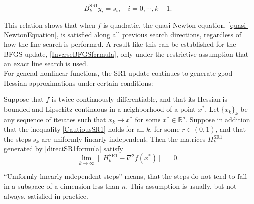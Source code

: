 \begin{equation}\label{HereditaryProperty}
    B^{\mathrm{SR1}}_k y_i = s_i, \quad i = 0, \cdots, k-1.
\end{equation}

This relation shows that when $f$ is quadratic, the quasi-Newton equation, \cref{quasi-NewtonEquation}, is satisfied along all previous search directions, regardless of how the line search is performed. A result like this can be established for the BFGS update, \cref{InverseBFGSformula}, only under the restrictive assumption that an exact line search is used. \\
For general nonlinear functions, the SR1 update continues to generate good Hessian approximations under certain conditions:

\begin{theorem}
    Suppose that $f$ is twice continuously differentiable, and that its Hessian is bounded and Lipschitz continuous in a neighborhood of a point $x^{*}$. Let $\{x_k\}_k$ be any sequence of iterates such that $x_k \rightarrow x^{*}$ for some $x^{*} \in \mathbb{R}^n$. Suppose in addition that the inequality \cref{CautiousSR1} holds for all $k$, for some $r \in (0,1)$, and that the steps $s_k$ are uniformly linearly independent. Then the matrices $H^{\mathrm{SR1}}_k$ generated by \cref{directSR1formula} satisfy
    \begin{equation*}
        \lim_{k \to \infty} \lVert H^{\mathrm{SR1}}_k - \nabla^2 f(x^{*}) \rVert = 0.
    \end{equation*}
\end{theorem}

“Uniformly linearly independent steps” means, that the steps do not tend to fall in a subspace of a dimension less than $n$. This assumption is usually, but not always, satisfied in practice.

